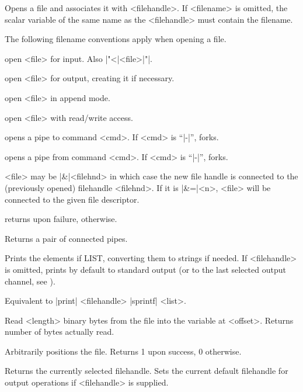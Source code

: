 \begin{enum}{1cm}
Opens a file and associates it with <filehandle>. If <filename> is
omitted, the scalar variable of the same name as the <filehandle> must
contain the filename.

The following filename conventions apply when opening a file.

\begin{enum}{2cm}
 open <file> for input. Also |"<|<file>|"|.

 open <file> for output, creating it if necessary.

 open <file> in append mode.

 open <file> with read/write access.

 opens a pipe to command <cmd>. If <cmd> is ``|-|'', forks.

 opens a pipe from command <cmd>. If <cmd> is ``|-|'', forks.
\end{enum}

<file> may be |&|<filehnd> in which case the new file handle is
connected to the (previously opened) filehandle <filehnd>.
If it is |&=|<n>, <file> will be connected to the given file descriptor.

returns  upon failure, \true{} otherwise.

Returns a pair of connected pipes.

Prints the elements if LIST, converting them to strings if needed. If
<filehandle> is omitted, prints by default to standard output (or to
the last selected output channel, see ).

\Xi{\kwd{printf} [ <filehandle> ] <list> ]}
Equivalent to |print| <filehandle> |sprintf| <list>.

Read <length> binary bytes from the file into the variable at
<offset>. Returns number of bytes actually read. 

Arbitrarily positions the file. Returns 1 upon success, 0 otherwise.

Returns the currently selected filehandle. 
Sets the current default filehandle for output operations if
<filehandle> is supplied.


\end{enum}
